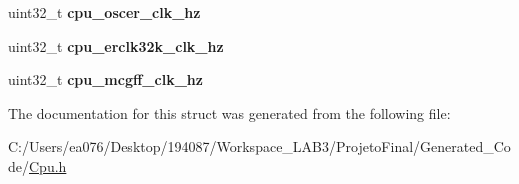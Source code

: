 \begin{DoxyCompactItemize}
\item 
\hypertarget{struct_t_cpu_clock_configuration_a8573f3896f85f97201ef2d6252d99905}{uint32\-\_\-t {\bfseries cpu\-\_\-oscer\-\_\-clk\-\_\-hz}}\label{struct_t_cpu_clock_configuration_a8573f3896f85f97201ef2d6252d99905}

\item 
\hypertarget{struct_t_cpu_clock_configuration_a3f68e3893f7dec551e938a909929687b}{uint32\-\_\-t {\bfseries cpu\-\_\-erclk32k\-\_\-clk\-\_\-hz}}\label{struct_t_cpu_clock_configuration_a3f68e3893f7dec551e938a909929687b}

\item 
\hypertarget{struct_t_cpu_clock_configuration_a5bd9b1235d0f85073ed01c126782d898}{uint32\-\_\-t {\bfseries cpu\-\_\-mcgff\-\_\-clk\-\_\-hz}}\label{struct_t_cpu_clock_configuration_a5bd9b1235d0f85073ed01c126782d898}

\end{DoxyCompactItemize}


The documentation for this struct was generated from the following file\-:\begin{DoxyCompactItemize}
\item 
C\-:/\-Users/ea076/\-Desktop/194087/\-Workspace\-\_\-\-L\-A\-B3/\-Projeto\-Final/\-Generated\-\_\-\-Code/\hyperlink{_cpu_8h}{Cpu.\-h}\end{DoxyCompactItemize}
